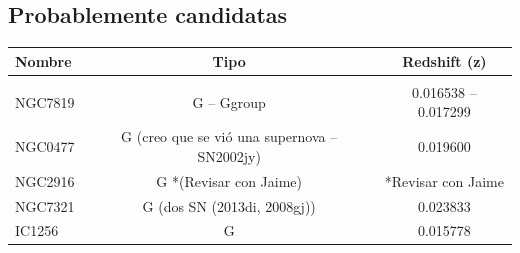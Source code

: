 \documentclass[9pt]{revtex4-1}
\begin{document}
\subsection{Probablemente candidatas}

\begin{center}
\begin{tabular}{ l c c }
Nombre & Tipo & Redshift (z) \\
\hline
\hline \\
NGC7819 & G -- Ggroup & 0.016538 -- 0.017299 \\
NGC0477 & G (creo que se vi\'o una supernova -- SN2002jy) & 0.019600 \\
NGC2916 & G *(Revisar con Jaime) & *Revisar con Jaime \\
NGC7321 & G (dos SN (2013di, 2008gj)) & 0.023833 \\
IC1256  & G & 0.015778 \\

\end{tabular}
\end{center}
\end{document}
